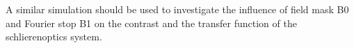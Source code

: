 \documentclass[oneside,a4paper,12pt,BCOR20mm,DIV14]{scrbook} %
\begin{document}
A similar simulation should be used to investigate the influence of
field mask B0 and Fourier stop B1 on the contrast and the transfer
function of the schlierenoptics system.












\appendix



%
\end{document}
